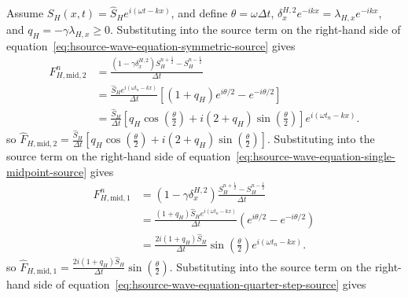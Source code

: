 \documentclass{article}
\numberwithin{figure}{section}
\begin{document}
Assume $S_H(x,t)=\widehat{S}_H e^{i(\omega t-kx)}$, and define $\theta=\omega\Delta t$, $\delta_x^{H,2}e^{-ikx}=\lambda_{H,x}e^{-ikx}$, and $q_H=-\gamma\lambda_{H,x}\geq0$. Substituting into the source term on the right-hand side of equation~\eqref{eq:hsource-wave-equation-symmetric-source} gives
\begin{equation}
    \begin{aligned} F_{H,\mathrm{mid,2}}^n & =\frac{\left(1-\gamma\delta_x^{H,2}\right)S_H^{n+\frac{1}{2}}-S_H^{n-\frac{1}{2}}}{\Delta t}                                                               \\
                                       & =\frac{\widehat{S}_H e^{i(\omega t_n-kx)}}{\Delta t}\left[\left(1+q_H\right)e^{i\theta/2}-e^{-i\theta/2}\right]                                            \\
                                       & =\frac{\widehat{S}_H}{\Delta t}\left[q_H\cos\left(\frac{\theta}{2}\right)+i\left(2+q_H\right)\sin\left(\frac{\theta}{2}\right)\right]e^{i(\omega t_n-kx)}.
    \end{aligned} \label{eq:hsource-midpoint-both-source-amplitude}
\end{equation}
so $\widehat{F}_{H,\mathrm{mid,2}}=\frac{\widehat{S}_H}{\Delta t}\left[q_H\cos\left(\frac{\theta}{2}\right)+i\left(2+q_H\right)\sin\left(\frac{\theta}{2}\right)\right]$.
Substituting into the source term on the right-hand side of equation~\eqref{eq:hsource-wave-equation-single-midpoint-source} gives
\begin{equation}
    \begin{aligned} F_{H,\mathrm{mid,1}}^n & =\left(1-\gamma\delta_x^{H,2}\right)\frac{S_H^{n+\frac{1}{2}}-S_H^{n-\frac{1}{2}}}{\Delta t}                    \\
                                       & =\frac{\left(1+q_H\right)\widehat{S}_H e^{i(\omega t_n-kx)}}{\Delta t}\left(e^{i\theta/2}-e^{-i\theta/2}\right) \\
                                       & =\frac{2i\left(1+q_H\right)\widehat{S}_H}{\Delta t}\sin\left(\frac{\theta}{2}\right)e^{i(\omega t_n-kx)}.
    \end{aligned} \label{eq:hsource-midpoint-source-amplitude}
\end{equation}
so $\widehat{F}_{H,\mathrm{mid,1}}=\frac{2i\left(1+q_H\right)\widehat{S}_H}{\Delta t}\sin\left(\frac{\theta}{2}\right)$.
Substituting into the source term on the right-hand side of equation~\eqref{eq:hsource-wave-equation-quarter-step-source} gives
\end{document}

